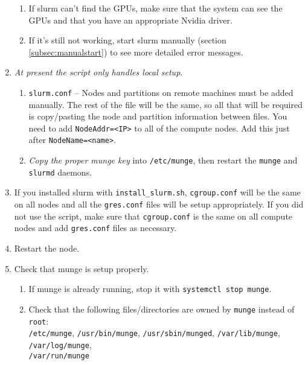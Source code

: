 \begin{enumerate}
\begin{enumerate}
	\item If slurm can't find the GPUs, make sure that the system can see the GPUs and that you have an appropriate Nvidia driver.

	\item If it's still not working, start slurm manually (section \ref{subsec:manualstart}) to see more detailed error messages. 
	\end{enumerate}

\item \emph{At present the script only handles local setup}. 

	\begin{enumerate}
	\item \texttt{slurm.conf} -- Nodes and partitions on remote machines must be added manually. The rest of the file will be the same, so all that will be required is copy/pasting the node and partition information between files. You need to add \texttt{NodeAddr=<IP>} to all of the compute nodes. Add this just after \texttt{NodeName=<name>}.

	\item \emph{Copy the proper munge key} into \texttt{/etc/munge}, then restart the \texttt{munge} and \texttt{slurmd} daemons.
	\end{enumerate}

\item If you installed slurm with \texttt{install\_slurm.sh}, \texttt{cgroup.conf} will be the same on all nodes and all the \texttt{gres.conf} files will be setup appropriately. If you did not use the script, make sure that \texttt{cgroup.conf} is the same on all compute nodes and add \texttt{gres.conf} files as necessary.

\item Restart the node.

\item Check that munge is setup properly. \label{list:munge}
	\begin{enumerate}
	\item If munge is already running, stop it with \texttt{systemctl stop munge}.

	\item Check that the following files/directories are owned by \texttt{munge} instead of \texttt{root}: \\
	\texttt{/etc/munge}, 
	\texttt{/usr/bin/munge}, 
	\texttt{/usr/sbin/munged}, 
	\texttt{/var/lib/munge}, 
	\texttt{/var/log/munge}, \\
	\texttt{/var/run/munge}


\end{enumerate}
\end{enumerate}
